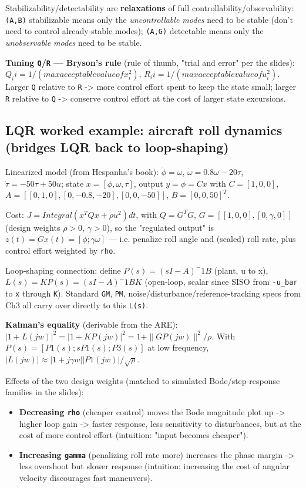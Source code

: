 \documentclass[11pt]{article}
\begin{document}
Stabilizability/detectability are \textbf{relaxations} of full controllability/observability: \texttt{(A,B)} stabilizable means only the \textit{uncontrollable modes} need to be stable (don't need to control already-stable modes); \texttt{(A,G)} detectable means only the \textit{unobservable modes} need to be stable.

\textbf{Tuning \texttt{Q}/\texttt{R} — Bryson's rule} (rule of thumb, "trial and error" per the slides): $Q_ii = 1 / (max acceptable value of x_i^2)$, $R_ii = 1 / (max acceptable value of u_i^2)$. Larger \texttt{Q} relative to \texttt{R} -> more control effort spent to keep the state small; larger \texttt{R} relative to \texttt{Q} -> conserve control effort at the cost of larger state excursions.

\subsection{LQR worked example: aircraft roll dynamics (bridges LQR back to loop-shaping)}
Linearized model (from Hespanha's book): $\dot{\phi} = \omega$, $\dot{\omega} = 0.8 \omega - 20 \tau$, $\dot{\tau} = -50 \tau + 50 u$; state $x=[\phi,\omega,\tau]$, output $y=\phi=Cx$ with $C=[1,0,0]$,
$A = [[0,1,0],[0,-0.8,-20],[0,0,-50]]$, $B = [0,0,50]^T$.

Cost: $J = Integral (x^T Q x + \rho u^2) dt$, with $Q = G^T G$, $G = [[1,0,0],[0,\gamma,0]]$ (design weights $\rho>0$, $\gamma>0$), so the "regulated output" is $z(t) = G x(t) = [\phi; \gamma \omega]$ — i.e. penalize roll angle and (scaled) roll rate, plus control effort weighted by \texttt{rho}.

Loop-shaping connection: define $P(s) = (sI-A)^-1 B$ (plant, u to x), $L(s) = K P(s) = (sI-A)^-1 B K$ (open-loop, scalar since SISO from \texttt{-u\_\allowbreak{}bar} to \texttt{x} through \texttt{K}). Standard \texttt{GM}, \texttt{PM}, noise/disturbance/reference-tracking specs from Ch3 all carry over directly to this \texttt{L(s)}.

\textbf{Kalman's equality} (derivable from the ARE): $|1 + L(jw)|^2 = |1 + KP(jw)|^2 = 1 + \|G P(jw)\|^2 / \rho$. With $P(s) = [P1(s); s P1(s); P3(s)]$ at low frequency, $|L(jw)| ≈ |1 + j \gamma w|   |P1(jw)| / \sqrt{\rho}$.

Effects of the two design weights (matched to simulated Bode/step-response families in the slides):
\begin{itemize}
\item \textbf{Decreasing \texttt{rho}} (cheaper control) moves the Bode magnitude plot up -> higher loop gain -> faster response, less sensitivity to disturbances, but at the cost of more control effort (intuition: "input becomes cheaper").
\item \textbf{Increasing \texttt{gamma}} (penalizing roll rate more) increases the phase margin -> less overshoot but slower response (intuition: increasing the cost of angular velocity discourages fast maneuvers).
\end{itemize}
\end{document}
